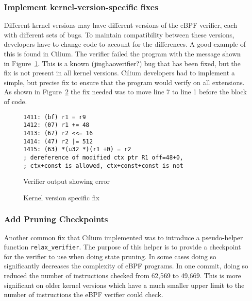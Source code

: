 \subsubsection{Implement kernel-version-specific fixes}
Different kernel versions may have different versions of the eBPF verifier, each with different sets of bugs.
To maintain compatibility between these versions, developers have to change code to account for the differences.
A good example of this is found in Cilium.
The verifier failed the program with the message shown in Figure~\ref{fig:kernel-version}.
This is a known (jinghao{verifier?}) bug that has been fixed, but the fix is not present in all kernel versions.
Cilium developers had to implement a simple, but precise fix to ensure that the program would verify on all extensions.
As shown in Figure~\ref{fig:kernel-version-code} the fix needed was to move line 7 to line 1 before the block of code.

\begin{figure}
    \begin{lstlisting}[language=myBPF]
1411: (bf) r1 = r9
1412: (07) r1 += 48
1413: (67) r2 <<= 16
1414: (47) r2 |= 512
1415: (63) *(u32 *)(r1 +0) = r2
; dereference of modified ctx ptr R1 off=48+0,
; ctx+const is allowed, ctx+const+const is not
    \end{lstlisting}
    \caption{Verifier output showing error}
    \label{fig:kernel-version}
\end{figure}

\begin{figure}
    
    \caption{Kernel version specific fix}
    \label{fig:kernel-version-code}
\end{figure}

\subsubsection{Add Pruning Checkpoints}
Another common fix that Cilium implemented was to introduce a pseudo-helper function \texttt{relax\_verifier}.
The purpose of this helper is to provide a checkpoint for the verifier to use when doing state pruning.
In some cases doing so significantly decreases the complexity of eBPF programs.
In one commit, doing so reduced the number of instructions checked from 62,569 to 49,669.
This is more significant on older kernel versions which have a much smaller upper limit to the number of instructions the eBPF verifier could check.

